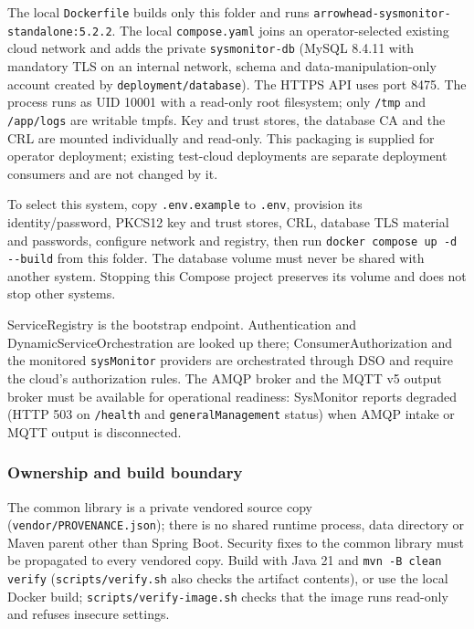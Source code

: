 \documentclass[a4paper]{arrowhead}
\begin{document}
The local \texttt{Dockerfile} builds only this folder and runs \texttt{arrowhead-\allowbreak{}sysmonitor-\allowbreak{}standalone:5.2.2}. The local \texttt{compose.yaml} joins an operator-selected existing cloud network and adds the private \texttt{sysmonitor-\allowbreak{}db} (MySQL 8.4.11 with mandatory TLS on an internal network, schema and data-manipulation-only account created by \texttt{deployment/\allowbreak{}database}). The HTTPS API uses port 8475. The process runs as UID 10001 with a read-only root filesystem; only \texttt{/tmp} and \texttt{/app/logs} are writable tmpfs. Key and trust stores, the database CA and the CRL are mounted individually and read-only. This packaging is supplied for operator deployment; existing test-cloud deployments are separate deployment consumers and are not changed by it.

To select this system, copy \texttt{.env.example} to \texttt{.env}, provision its identity/password, PKCS12 key and trust stores, CRL, database TLS material and passwords, configure network and registry, then run \texttt{docker compose up -\allowbreak{}d -\allowbreak{}-\allowbreak{}build} from this folder. The database volume must never be shared with another system. Stopping this Compose project preserves its volume and does not stop other systems.

ServiceRegistry is the bootstrap endpoint. Authentication and DynamicServiceOrchestration are looked up there; ConsumerAuthorization and the monitored \texttt{sysMonitor} providers are orchestrated through DSO and require the cloud's authorization rules. The AMQP broker and the MQTT v5 output broker must be available for operational readiness: SysMonitor reports degraded (HTTP 503 on \texttt{/health} and \texttt{generalManagement} status) when AMQP intake or MQTT output is disconnected.

\subsubsection{Ownership and build boundary}
The common library is a private vendored source copy (\texttt{vendor/\allowbreak{}PROVENANCE.json}); there is no shared runtime process, data directory or Maven parent other than Spring Boot. Security fixes to the common library must be propagated to every vendored copy. Build with Java 21 and \texttt{mvn -\allowbreak{}B clean verify} (\texttt{scripts/\allowbreak{}verify.sh} also checks the artifact contents), or use the local Docker build; \texttt{scripts/\allowbreak{}verify-\allowbreak{}image.sh} checks that the image runs read-only and refuses insecure settings.
\end{document}

